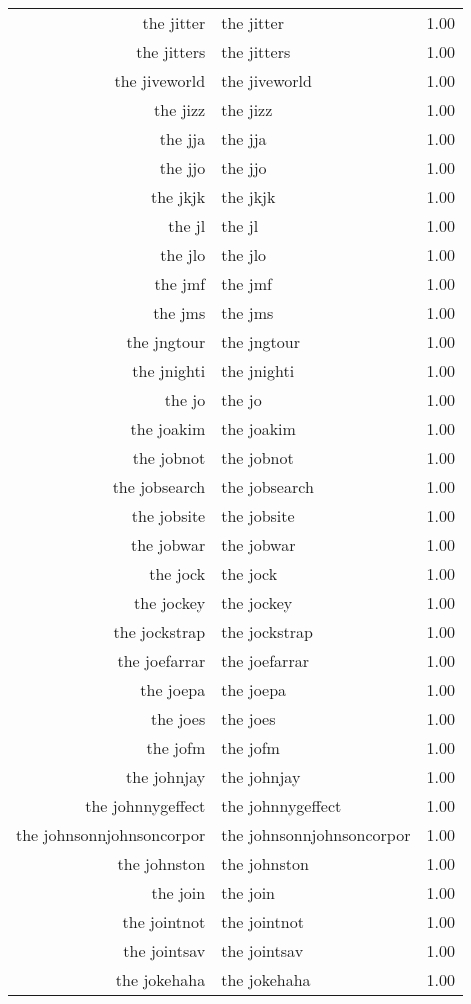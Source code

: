 \begin{table}[ht]
\begin{tabular}{rlr}
  the jitter & the jitter & 1.00 \\ 
  the jitters & the jitters & 1.00 \\ 
  the jiveworld & the jiveworld & 1.00 \\ 
  the jizz & the jizz & 1.00 \\ 
  the jja & the jja & 1.00 \\ 
  the jjo & the jjo & 1.00 \\ 
  the jkjk & the jkjk & 1.00 \\ 
  the jl & the jl & 1.00 \\ 
  the jlo & the jlo & 1.00 \\ 
  the jmf & the jmf & 1.00 \\ 
  the jms & the jms & 1.00 \\ 
  the jngtour & the jngtour & 1.00 \\ 
  the jnighti & the jnighti & 1.00 \\ 
  the jo & the jo & 1.00 \\ 
  the joakim & the joakim & 1.00 \\ 
  the jobnot & the jobnot & 1.00 \\ 
  the jobsearch & the jobsearch & 1.00 \\ 
  the jobsite & the jobsite & 1.00 \\ 
  the jobwar & the jobwar & 1.00 \\ 
  the jock & the jock & 1.00 \\ 
  the jockey & the jockey & 1.00 \\ 
  the jockstrap & the jockstrap & 1.00 \\ 
  the joefarrar & the joefarrar & 1.00 \\ 
  the joepa & the joepa & 1.00 \\ 
  the joes & the joes & 1.00 \\ 
  the jofm & the jofm & 1.00 \\ 
  the johnjay & the johnjay & 1.00 \\ 
  the johnnygeffect & the johnnygeffect & 1.00 \\ 
  the johnsonnjohnsoncorpor & the johnsonnjohnsoncorpor & 1.00 \\ 
  the johnston & the johnston & 1.00 \\ 
  the join & the join & 1.00 \\ 
  the jointnot & the jointnot & 1.00 \\ 
  the jointsav & the jointsav & 1.00 \\ 
  the jokehaha & the jokehaha & 1.00 \\ 

\end{tabular}
\end{table}
